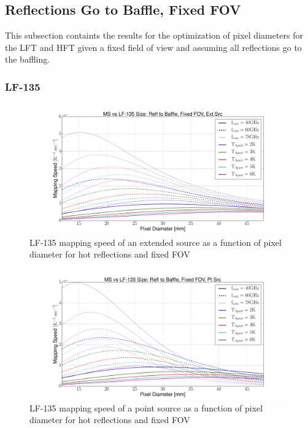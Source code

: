 \documentclass[12pt, titlepage]{article} %
\begin{document}

\subsection{Reflections Go to Baffle, Fixed FOV}

This subsection containts the results for the optimization of pixel diameters for the LFT and HFT given a fixed field of view and assuming all reflections go to the baffling.

\clearpage


\subsubsection{LF-135}

\begin{figure}[H]
	\centering
	\includegraphics[width=1.1\textwidth, center]{PDF/LFT_MS_LF-135_hotRefl_fixFOV_extSrc.pdf}
	\caption{LF-135 mapping speed of an extended source as a function of pixel diameter for hot reflections and fixed FOV}
\end{figure}

\begin{figure}[H]
	\centering
	\includegraphics[width=1.1\textwidth, center]{PDF/LFT_MS_LF-135_hotRefl_fixFOV_ptSrc.pdf}
	\caption{LF-135 mapping speed of a point source as a function of pixel diameter for hot reflections and fixed FOV}
\end{figure}
\end{document}
